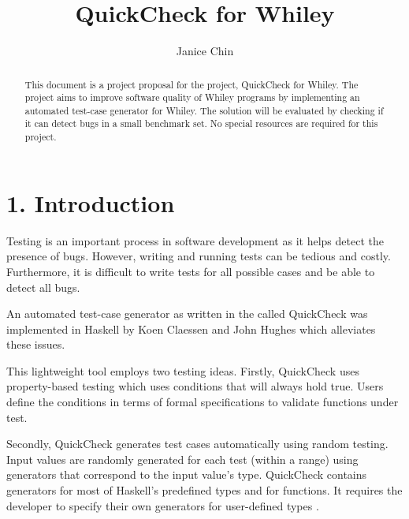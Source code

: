 \documentclass[11pt, a4paper, oneside, openright]{report}
\title{QuickCheck for Whiley}
\author{Janice Chin}
\date{}
\begin{document}
\frontmatter


\begin{abstract}
   This document is a project proposal for the project, QuickCheck for Whiley. 
   The project aims to improve software quality of Whiley programs by  implementing an automated test-case generator for Whiley.
   The solution will be evaluated by checking if it can detect bugs in a small benchmark set. No special resources are required for this project.
\end{abstract}


\maketitle




\mainmatter


\section*{1. Introduction}
Testing is an important process in software development as it helps detect the presence of bugs.
However, writing and running tests can be tedious and costly. Furthermore, it is difficult to write tests for all possible cases and be able to detect all bugs.

An automated test-case generator as written in the called QuickCheck was implemented in Haskell by Koen Claessen and John Hughes \cite{QClightweight} which alleviates these issues.

This lightweight tool employs two testing ideas.
Firstly, QuickCheck uses property-based testing which uses conditions that will always hold true. Users define the conditions in terms of formal specifications to validate functions under test.

Secondly, QuickCheck generates test cases automatically using random testing. Input values are randomly generated for each test (within a range) using generators that correspond to the input value's type. QuickCheck contains generators for most of Haskell's predefined types and for functions. It requires the developer to specify their own generators for user-defined types \cite{QClightweight}. 
\end{document}
